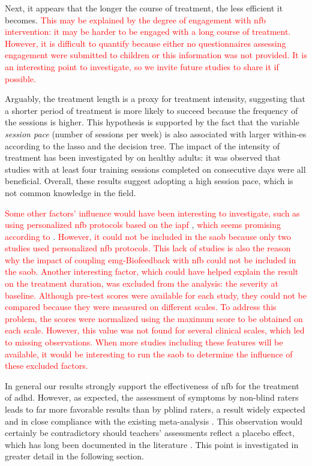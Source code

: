 Next, it appears that the longer the course of treatment, the less efficient it becomes. \textcolor{red}{This may be explained by the degree of 
engagement with \gls{nfb} intervention: it may be harder to be engaged with a long course of treatment. However, it is difficult to quantify because 
either no questionnaires assessing engagement were submitted to children or this information was not provided. It is an interesting point to investigate,
so we invite future studies to share it if possible.}

Arguably, the treatment length is a proxy for treatment intensity, suggesting that a shorter period of treatment is more likely to succeed because the frequency of the sessions
is higher. This hypothesis is supported by the fact that the variable \emph{session pace} (number of
sessions per week) is also associated with larger within-\gls{es} according to the \gls{lasso} and the decision tree. The impact of the
intensity of treatment has been investigated by \citep{Rogala2016} on healthy adults: it was observed that studies with
at least four training sessions completed on consecutive days were all beneficial. Overall, these results suggest adopting a high session pace, 
which is not common knowledge in the field.

\textcolor{red}{Some other factors' influence would have been interesting to investigate, such as using personalized \gls{nfb} protocols based on the 
\gls{iapf}} \citep{Liu2016}, \textcolor{red}{which seems promising according to} \citet{Bazanova2018, Escolano2014}. \textcolor{red}{However, it could not be included in the 
\gls{saob} because only two studies used personalized \gls{nfb} protocols. This lack of studies is also the reason why the impact of coupling \gls{emg}-Biofeedback with \gls{nfb} could not be 
included in the \gls{saob}. Another interesting factor, which could have helped explain the result on the treatment duration, was excluded from the analysis: 
the severity at baseline. Although pre-test scores were available for each study, they could not be compared because 
they were measured on different scales. To address this problem, the scores were normalized using the maximum score to be obtained on each scale. However, this value was not found 
for several clinical scales, which led to missing observations. When more studies including these features will be available, it would be interesting to run the 
\gls{saob} to determine the influence of these excluded factors.} 

In general our results strongly support the effectiveness of \gls{nfb} for the treatment of \gls{adhd}. However, as expected, 
the assessment of symptoms by non-blind raters leads to far more favorable results than by \gls{pblind} raters, a result 
widely expected and in close compliance with the existing meta-analysis \citep{Cortese2016, Micoulaud2014}. 
This observation would certainly be contradictory should teachers’ 
assessments reflect a placebo effect, which has long been documented in the literature \citep{Sollie2013, Narad2015, Minder2018}. 
This point is investigated in greater detail in the following section.

